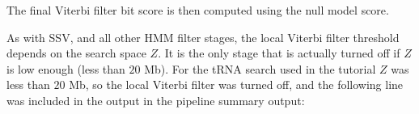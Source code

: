 The final Viterbi filter bit score is then computed using the null
model score. 


As with SSV, and all other HMM filter stages, the local Viterbi filter
threshold depends on the search space $Z$. It is the only stage that
is actually turned off if $Z$ is low enough (less than $20$ Mb). 
For the tRNA search used in the tutorial $Z$ was less than $20$ Mb, so
the local Viterbi filter was turned off, and the following line was
included in the output in the pipeline summary output:

